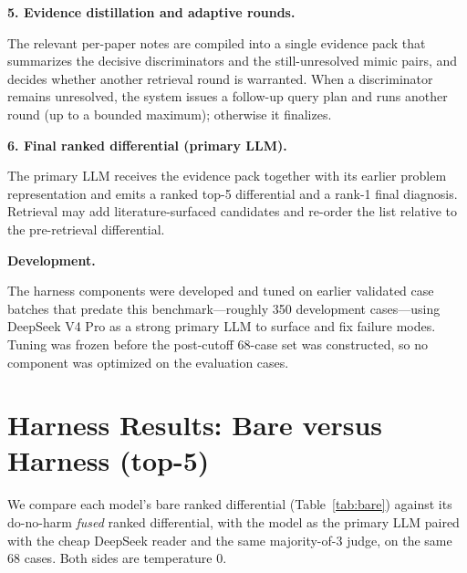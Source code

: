 \documentclass{article}
\renewcommand{\paragraph}[1]{%
  \par\addvspace{0.42\baselineskip}%
  \noindent\textbf{#1}\par\nobreak\vspace{-0.28\baselineskip}%
}
\begin{document}
\paragraph{5. Evidence distillation and adaptive rounds.} The relevant per-paper notes are compiled into a
single evidence pack that summarizes the decisive discriminators and the still-unresolved mimic pairs, and
decides whether another retrieval round is warranted. When a discriminator remains unresolved, the system
issues a follow-up query plan and runs another round (up to a bounded maximum); otherwise it finalizes.

\paragraph{6. Final ranked differential (primary LLM).} The primary LLM receives the evidence pack together
with its earlier problem representation and emits a ranked top-5 differential and a rank-1 final diagnosis.
Retrieval may add literature-surfaced candidates and re-order the list relative to the pre-retrieval
differential.

\paragraph{Development.} The harness components were developed and tuned on earlier validated case batches
that predate this benchmark---roughly 350 development cases---using DeepSeek V4 Pro as a strong primary LLM
to surface and fix failure modes. Tuning was frozen before the post-cutoff 68-case set was constructed, so
no component was optimized on the evaluation cases.

\section{Harness Results: Bare versus Harness (top-5)}\label{sec:harnessresults}

We compare each model's bare ranked differential (Table~\ref{tab:bare}) against its do-no-harm \emph{fused}
ranked differential, with the model as the primary LLM paired with the cheap DeepSeek reader and the same
majority-of-3 judge, on the same 68 cases. Both sides are temperature 0.
\end{document}
